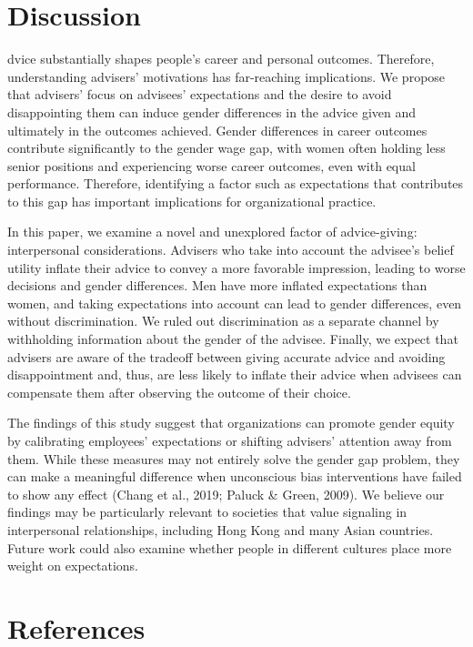 \documentclass[
  man,floatsintext]{apa6}
\begin{document}
\hypertarget{discussion-1}{%
\section{Discussion}\label{discussion-1}}

dvice substantially shapes people's career and personal outcomes. Therefore, understanding advisers' motivations has far-reaching implications. We propose that advisers' focus on advisees' expectations and the desire to avoid disappointing them can induce gender differences in the advice given and ultimately in the outcomes achieved. Gender differences in career outcomes contribute significantly to the gender wage gap, with women often holding less senior positions and experiencing worse career outcomes, even with equal performance. Therefore, identifying a factor such as expectations that contributes to this gap has important implications for organizational practice.

In this paper, we examine a novel and unexplored factor of advice-giving: interpersonal considerations. Advisers who take into account the advisee's belief utility inflate their advice to convey a more favorable impression, leading to worse decisions and gender differences. Men have more inflated expectations than women, and taking expectations into account can lead to gender differences, even without discrimination. We ruled out discrimination as a separate channel by withholding information about the gender of the advisee. Finally, we expect that advisers are aware of the tradeoff between giving accurate advice and avoiding disappointment and, thus, are less likely to inflate their advice when advisees can compensate them after observing the outcome of their choice.

The findings of this study suggest that organizations can promote gender equity by calibrating employees' expectations or shifting advisers' attention away from them. While these measures may not entirely solve the gender gap problem, they can make a meaningful difference when unconscious bias interventions have failed to show any effect (Chang et al., 2019; Paluck \& Green, 2009). We believe our findings may be particularly relevant to societies that value signaling in interpersonal relationships, including Hong Kong and many Asian countries. Future work could also examine whether people in different cultures place more weight on expectations.

\hypertarget{references}{%
\section{References}\label{references}}
\end{document}
